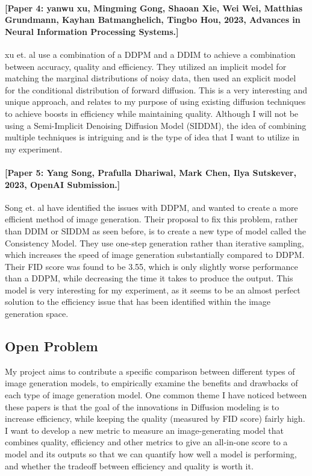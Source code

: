 \documentclass[11pt, letterpaper]{article}
\begin{document}
\paragraph{[Paper 4: yanwu xu, Mingming Gong, Shaoan Xie, Wei Wei, Matthias Grundmann, Kayhan Batmanghelich, Tingbo Hou, 2023, Advances in Neural Information Processing Systems.]}
xu et. al use a combination of a DDPM and a DDIM to achieve a combination between accuracy, quality and efficiency. They utilized an implicit model for matching the marginal distributions of noisy data, then used an explicit model for the conditional distribution of forward diffusion. This is a very interesting and unique approach, and relates to my purpose of using existing diffusion techniques to achieve boosts in efficiency while maintaining quality. Although I will not be using a Semi-Implicit Denoising Diffusion Model (SIDDM), the idea of combining multiple techniques is intriguing and is the type of idea that I want to utilize in my experiment.

\paragraph{[Paper 5: Yang Song, Prafulla Dhariwal, Mark Chen, Ilya Sutskever, 2023, OpenAI Submission.]}
Song et. al have identified the issues with DDPM, and wanted to create a more efficient method of image generation. Their proposal to fix this problem, rather than DDIM or SIDDM as seen before, is to create a new type of model called the Consistency Model. They use one-step generation rather than iterative sampling, which increases the speed of image generation substantially compared to DDPM. Their FID score was found to be 3.55, which is only slightly worse performance than a DDPM, while decreasing the time it takes to produce the output. This model is very interesting for my experiment, as it seems to be an almost perfect solution to the efficiency issue that has been identified within the image generation space.

\subsection{Open Problem}

My project aims to contribute a specific comparison between different types of image generation models, to empirically examine the benefits and drawbacks of each type of image generation model. One common theme I have noticed between these papers is that the goal of the innovations in Diffusion modeling is to increase efficiency, while keeping the quality (measured by FID score) fairly high. I want to develop a new metric to measure an image-generating model that combines quality, efficiency and other metrics to give an all-in-one score to a model and its outputs so that we can quantify how well a model is performing, and whether the tradeoff between efficiency and quality is worth it.
\end{document}
